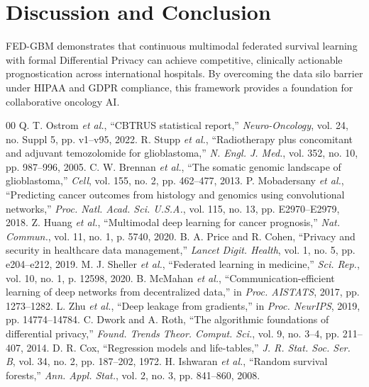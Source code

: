 \documentclass[journal,10pt,twocolumn]{IEEEtran}
\begin{document}
\section{Discussion and Conclusion}
FED-GBM demonstrates that continuous multimodal federated survival learning with formal Differential Privacy can achieve competitive, clinically actionable prognostication across international hospitals. By overcoming the data silo barrier under HIPAA and GDPR compliance, this framework provides a foundation for collaborative oncology AI.


\begin{thebibliography}{00}
 Q. T. Ostrom \textit{et al.}, ``CBTRUS statistical report,'' \textit{Neuro-Oncology}, vol. 24, no. Suppl 5, pp. v1--v95, 2022.
 R. Stupp \textit{et al.}, ``Radiotherapy plus concomitant and adjuvant temozolomide for glioblastoma,'' \textit{N. Engl. J. Med.}, vol. 352, no. 10, pp. 987--996, 2005.
 C. W. Brennan \textit{et al.}, ``The somatic genomic landscape of glioblastoma,'' \textit{Cell}, vol. 155, no. 2, pp. 462--477, 2013.
 P. Mobadersany \textit{et al.}, ``Predicting cancer outcomes from histology and genomics using convolutional networks,'' \textit{Proc. Natl. Acad. Sci. U.S.A.}, vol. 115, no. 13, pp. E2970--E2979, 2018.
 Z. Huang \textit{et al.}, ``Multimodal deep learning for cancer prognosis,'' \textit{Nat. Commun.}, vol. 11, no. 1, p. 5740, 2020.
 B. A. Price and R. Cohen, ``Privacy and security in healthcare data management,'' \textit{Lancet Digit. Health}, vol. 1, no. 5, pp. e204--e212, 2019.
 M. J. Sheller \textit{et al.}, ``Federated learning in medicine,'' \textit{Sci. Rep.}, vol. 10, no. 1, p. 12598, 2020.
 B. McMahan \textit{et al.}, ``Communication-efficient learning of deep networks from decentralized data,'' in \textit{Proc. AISTATS}, 2017, pp. 1273--1282.
 L. Zhu \textit{et al.}, ``Deep leakage from gradients,'' in \textit{Proc. NeurIPS}, 2019, pp. 14774--14784.
 C. Dwork and A. Roth, ``The algorithmic foundations of differential privacy,'' \textit{Found. Trends Theor. Comput. Sci.}, vol. 9, no. 3--4, pp. 211--407, 2014.
 D. R. Cox, ``Regression models and life-tables,'' \textit{J. R. Stat. Soc. Ser. B}, vol. 34, no. 2, pp. 187--202, 1972.
 H. Ishwaran \textit{et al.}, ``Random survival forests,'' \textit{Ann. Appl. Stat.}, vol. 2, no. 3, pp. 841--860, 2008.

\end{thebibliography}
\end{document}
